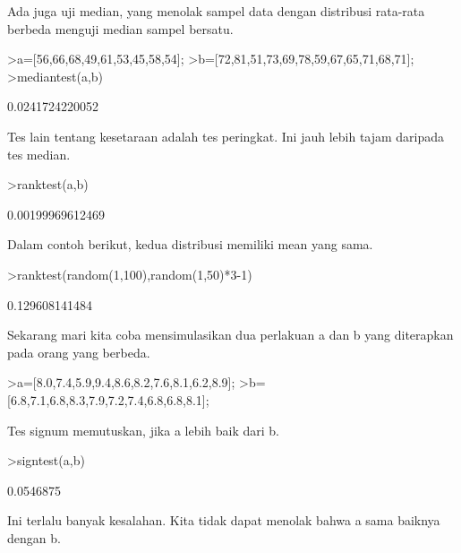 \documentclass{article}
\begin{document}
\begin{eulernotebook}
\begin{eulercomment}
\begin{eulercomment}
\begin{eulercomment}
Ada juga uji median, yang menolak sampel data dengan distribusi
rata-rata berbeda menguji median sampel bersatu.
\end{eulercomment}
\begin{eulerprompt}
>a=[56,66,68,49,61,53,45,58,54];
>b=[72,81,51,73,69,78,59,67,65,71,68,71];
>mediantest(a,b)
\end{eulerprompt}
\begin{euleroutput}
  0.0241724220052
\end{euleroutput}
\begin{eulercomment}
Tes lain tentang kesetaraan adalah tes peringkat. Ini jauh lebih tajam
daripada tes median.
\end{eulercomment}
\begin{eulerprompt}
>ranktest(a,b)
\end{eulerprompt}
\begin{euleroutput}
  0.00199969612469
\end{euleroutput}
\begin{eulercomment}
Dalam contoh berikut, kedua distribusi memiliki mean yang sama.
\end{eulercomment}
\begin{eulerprompt}
>ranktest(random(1,100),random(1,50)*3-1)
\end{eulerprompt}
\begin{euleroutput}
  0.129608141484
\end{euleroutput}
\begin{eulercomment}
Sekarang mari kita coba mensimulasikan dua perlakuan a dan b yang
diterapkan pada orang yang berbeda.
\end{eulercomment}
\begin{eulerprompt}
>a=[8.0,7.4,5.9,9.4,8.6,8.2,7.6,8.1,6.2,8.9];
>b=[6.8,7.1,6.8,8.3,7.9,7.2,7.4,6.8,6.8,8.1];
\end{eulerprompt}
\begin{eulercomment}
Tes signum memutuskan, jika a lebih baik dari b.
\end{eulercomment}
\begin{eulerprompt}
>signtest(a,b)
\end{eulerprompt}
\begin{euleroutput}
  0.0546875
\end{euleroutput}
\begin{eulercomment}
Ini terlalu banyak kesalahan. Kita tidak dapat menolak bahwa a sama
baiknya dengan b.


\end{eulercomment}
\end{eulercomment}
\end{eulercomment}
\end{eulernotebook}
\end{document}
